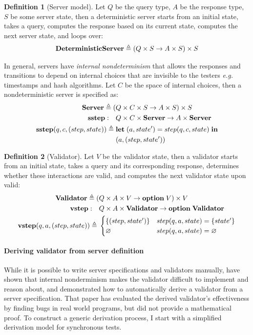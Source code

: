 \documentclass{article}
\theoremstyle{definition}
\newtheorem{definition}{Definition}
\newcommand{\Let}{\ottkw{let}\;}
\newcommand{\In}{\;\ottkw{in}}
\newcommand{\letin}[2]{\Let#1=#2\In}
\newcommand{\Server}{\ottkw{Server}}
\newcommand{\Validator}{\ottkw{Validator}}
\newcommand{\sstep}{\ottkw{sstep}}
\newcommand{\vstep}{\ottkw{vstep}}
\newcommand{\option}{\ottkw{option}\;}
\newcommand{\Some}[1]{\{#1\}}
\newcommand{\None}{\varnothing}
\begin{document}
\begin{definition}[Server model]
Let $Q$ be the query type, $A$ be the response type, $S$ be some server state,
then a deterministic server starts from an initial state, takes a query,
computes the response based on its current state, computes the next server
state, and loops over:
\[ \mathbf{DeterministicServer}\triangleq (Q \times S \to A \times S) \times S \]

In general, servers have {\em internal nondeterminism} that allows the responses
and transitions to depend on internal choices that are invisible to the testers
{\it e.g.} timestamps and hash algorithms.  Let $C$ be the space of internal
choices, then a nondeterministic server is specified as:
\begin{align*}
  \Server\triangleq (&Q \times C \times S \to A \times S) \times S \\
  \sstep :\quad&Q\times C \times \Server \to A\times \Server \\
  \sstep(q,c,(step, state))\triangleq\;&\letin{(a,state')}{step(q,c,state)} \\
  &(a, (step, state'))
\end{align*}
\end{definition}

\begin{definition}[Validator]
Let $V$ be the validator state, then a validator starts from an initial state,
takes a query and its corresponding response, determines whether these
interactions are valid, and computes the next validator state upon valid:
\begin{align*}
  \Validator\triangleq(&Q \times A \times V \to \option V) \times V \\
  \vstep:\quad&Q\times A \times \Validator \to \option \Validator \\
  \vstep(q,a,(step, state))\triangleq\;&\begin{cases}
  \Some{(step,state')} & step(q,a,state)=\Some{state'} \\
  \None & step(q,a,state)=\None
  \end{cases}
\end{align*}
\end{definition}

\paragraph{Deriving validator from server definition}
While it is possible to write server specifications and validators manually,
\textcite{li2021modelbased} have shown that internal nonderminism makes the
validator difficult to implement and reason about, and demonstrated how to
automatically derive a validator from a server specification.  That paper has
evaluated the derived validator's effectiveness by finding bugs in real world
programs, but did not provide a mathematical proof.  To construct a generic
derivation process, I start with a simplified derivation model for synchronous
tests.
\end{document}

